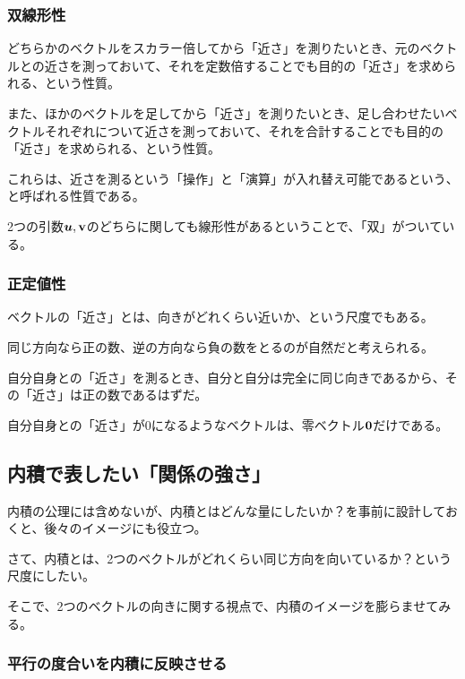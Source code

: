 \documentclass[../../imaging-math]{subfiles}
\begin{document}
\subsubsection{双線形性}

どちらかのベクトルをスカラー倍してから「近さ」を測りたいとき、元のベクトルとの近さを測っておいて、それを定数倍することでも目的の「近さ」を求められる、という性質。

また、ほかのベクトルを足してから「近さ」を測りたいとき、足し合わせたいベクトルそれぞれについて近さを測っておいて、それを合計することでも目的の「近さ」を求められる、という性質。

\br

これらは、近さを測るという「操作」と「演算」が入れ替え可能であるという、と呼ばれる性質である。

2つの引数$\vb*{u}, \vb{v}$のどちらに関しても線形性があるということで、「双」がついている。

\subsubsection{正定値性}

ベクトルの「近さ」とは、向きがどれくらい近いか、という尺度でもある。

同じ方向なら正の数、逆の方向なら負の数をとるのが自然だと考えられる。

\br

自分自身との「近さ」を測るとき、自分と自分は完全に同じ向きであるから、その「近さ」は正の数であるはずだ。

自分自身との「近さ」が$0$になるようなベクトルは、零ベクトル$\vb{0}$だけである。

\subsection{内積で表したい「関係の強さ」}

内積の公理には含めないが、内積とはどんな量にしたいか？を事前に設計しておくと、後々のイメージにも役立つ。

\br

さて、内積とは、2つのベクトルがどれくらい同じ方向を向いているか？という尺度にしたい。

そこで、2つのベクトルの向きに関する視点で、内積のイメージを膨らませてみる。

\subsubsection{平行の度合いを内積に反映させる}
\end{document}
